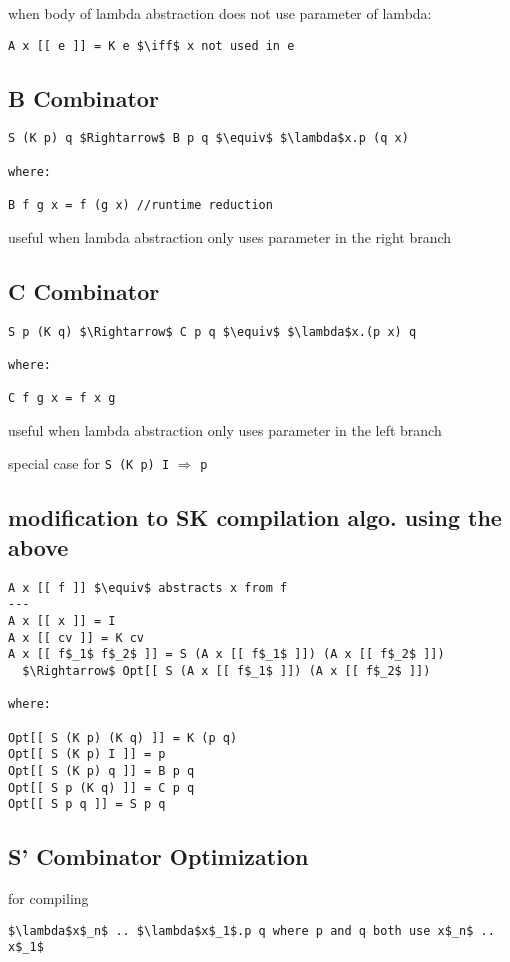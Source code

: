 \documentclass[8pt]{extarticle}
\begin{document}
\begin{multicols*}{2}
\begin{tblr}[]{}
when body of lambda abstraction does not use parameter of lambda:
\begin{lstlisting}
A x [[ e ]] = K e $\iff$ x not used in e
\end{lstlisting}

\subsection{B Combinator}

\begin{lstlisting}
S (K p) q $Rightarrow$ B p q $\equiv$ $\lambda$x.p (q x)

where:

B f g x = f (g x) //runtime reduction
\end{lstlisting}

useful when lambda abstraction only uses parameter in the right branch

\subsection{C Combinator}
\begin{lstlisting}
S p (K q) $\Rightarrow$ C p q $\equiv$ $\lambda$x.(p x) q

where:

C f g x = f x g
\end{lstlisting}

useful when lambda abstraction only uses parameter in the left branch

special case for \verb|S (K p) I| $\Rightarrow$ \verb|p|

\subsection{modification to SK compilation algo. using the above}

\begin{lstlisting}
A x [[ f ]] $\equiv$ abstracts x from f
---
A x [[ x ]] = I
A x [[ cv ]] = K cv
A x [[ f$_1$ f$_2$ ]] = S (A x [[ f$_1$ ]]) (A x [[ f$_2$ ]])
  $\Rightarrow$ Opt[[ S (A x [[ f$_1$ ]]) (A x [[ f$_2$ ]])

where:

Opt[[ S (K p) (K q) ]] = K (p q)
Opt[[ S (K p) I ]] = p
Opt[[ S (K p) q ]] = B p q
Opt[[ S p (K q) ]] = C p q
Opt[[ S p q ]] = S p q
\end{lstlisting}

\subsection{S' Combinator Optimization}
for compiling
\begin{lstlisting}
$\lambda$x$_n$ .. $\lambda$x$_1$.p q where p and q both use x$_n$ .. x$_1$
\end{lstlisting}


\end{tblr}
\end{multicols*}
\end{document}
